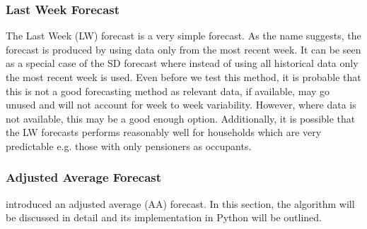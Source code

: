 \documentclass[a4paper]{article}
\begin{document}
\subsubsection{Last Week Forecast} \label{subsubsec:lwforecast}
The Last Week (LW) forecast is a very simple forecast. As the name suggests, the forecast is produced by using data only from the most recent week. It can be seen as a special case of the SD forecast where instead of using all historical data only the most recent week is used. Even before we test this method, it is probable that this is not a good forecasting method as relevant data, if available, may go unused and will not account for week to week variability. However, where data is not available, this may be a good enough option. Additionally, it is possible that the LW forecasts performs reasonably well for households which are very predictable e.g. those with only pensioners as occupants.

\subsubsection{Adjusted Average Forecast} \label{subsubsec:AAforecast}
\cite{dan14} introduced an adjusted average (AA) forecast. In this section, the algorithm will be discussed in detail and its implementation in Python will be outlined.
\end{document}
